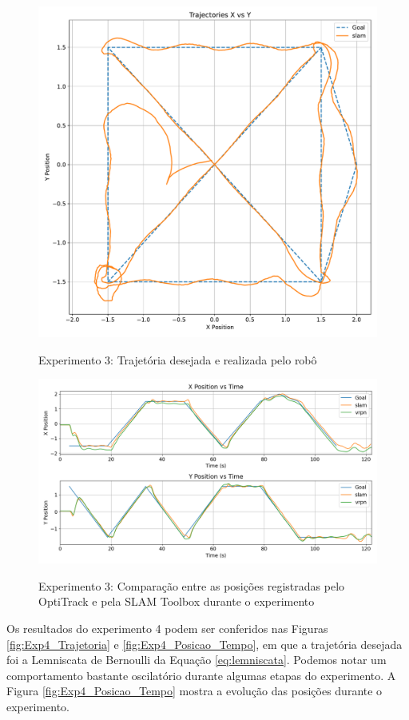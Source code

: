 \begin{figure}[htb]
    \centering
    \caption{Experimento 3: Trajetória desejada e realizada pelo robô}
    \includegraphics[width=0.7\linewidth]{img/Resultados/Exp3_SLAM_Control_LINEAR/Trajetoria_Controller.pdf}
    \source
    \label{fig:Exp3_Trajetoria}
\end{figure}

\begin{figure}[htb]
    \centering
    \caption{Experimento 3: Comparação entre as posições registradas pelo OptiTrack e pela SLAM Toolbox durante o experimento}
    \includegraphics[width=0.8\linewidth]{img/Resultados/Exp3_SLAM_Control_LINEAR/XY_Position_v_Time_ALL.png}
    \source
    \label{fig:Exp3_Posicao_Tempo}
\end{figure}


Os resultados do experimento 4 podem ser conferidos nas Figuras \ref{fig:Exp4_Trajetoria} e \ref{fig:Exp4_Posicao_Tempo}, em que a trajetória desejada foi a Lemniscata de Bernoulli da Equação \ref{eq:lemniscata}. Podemos notar um comportamento bastante oscilatório durante algumas etapas do experimento. A Figura \ref{fig:Exp4_Posicao_Tempo} mostra a evolução das posições durante o experimento.

